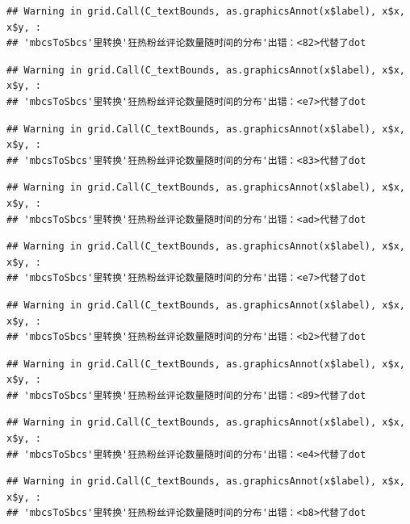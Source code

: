 \documentclass[
]{article}
\begin{document}
\begin{verbatim}
## Warning in grid.Call(C_textBounds, as.graphicsAnnot(x$label), x$x, x$y, :
## 'mbcsToSbcs'里转换'狂热粉丝评论数量随时间的分布'出错：<82>代替了dot
\end{verbatim}

\begin{verbatim}
## Warning in grid.Call(C_textBounds, as.graphicsAnnot(x$label), x$x, x$y, :
## 'mbcsToSbcs'里转换'狂热粉丝评论数量随时间的分布'出错：<e7>代替了dot
\end{verbatim}

\begin{verbatim}
## Warning in grid.Call(C_textBounds, as.graphicsAnnot(x$label), x$x, x$y, :
## 'mbcsToSbcs'里转换'狂热粉丝评论数量随时间的分布'出错：<83>代替了dot
\end{verbatim}

\begin{verbatim}
## Warning in grid.Call(C_textBounds, as.graphicsAnnot(x$label), x$x, x$y, :
## 'mbcsToSbcs'里转换'狂热粉丝评论数量随时间的分布'出错：<ad>代替了dot
\end{verbatim}

\begin{verbatim}
## Warning in grid.Call(C_textBounds, as.graphicsAnnot(x$label), x$x, x$y, :
## 'mbcsToSbcs'里转换'狂热粉丝评论数量随时间的分布'出错：<e7>代替了dot
\end{verbatim}

\begin{verbatim}
## Warning in grid.Call(C_textBounds, as.graphicsAnnot(x$label), x$x, x$y, :
## 'mbcsToSbcs'里转换'狂热粉丝评论数量随时间的分布'出错：<b2>代替了dot
\end{verbatim}

\begin{verbatim}
## Warning in grid.Call(C_textBounds, as.graphicsAnnot(x$label), x$x, x$y, :
## 'mbcsToSbcs'里转换'狂热粉丝评论数量随时间的分布'出错：<89>代替了dot
\end{verbatim}

\begin{verbatim}
## Warning in grid.Call(C_textBounds, as.graphicsAnnot(x$label), x$x, x$y, :
## 'mbcsToSbcs'里转换'狂热粉丝评论数量随时间的分布'出错：<e4>代替了dot
\end{verbatim}

\begin{verbatim}
## Warning in grid.Call(C_textBounds, as.graphicsAnnot(x$label), x$x, x$y, :
## 'mbcsToSbcs'里转换'狂热粉丝评论数量随时间的分布'出错：<b8>代替了dot
\end{verbatim}
\end{document}
